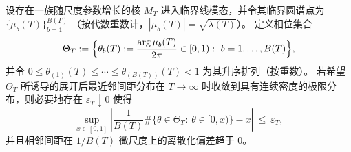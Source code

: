 \begin{conjecture}\label{conj:operator-phase-comb-uniformization-necessary}
设存在一族随尺度参数增长的核 \(M_T\) 进入临界线模态，并令其临界圆谱点为
\(
\{\mu_b(T)\}_{b=1}^{B(T)}
\)
（按代数重数计，\(|\mu_b(T)|=\sqrt{\lambda(T)}\)）。
定义相位集合
\[
\Theta_T:=\Bigl\{\theta_b(T):=\frac{\arg\mu_b(T)}{2\pi}\in[0,1):\ b=1,\dots,B(T)\Bigr\},
\]
并令 \(0\le \theta_{(1)}(T)\le\cdots\le \theta_{(B(T))}(T)<1\) 为其升序排列（按重数）。
若希望 \(\Theta_T\) 所诱导的展开后最近邻间距分布在 \(T\to\infty\) 时收敛到具有连续密度的极限分布，则必要地存在 \(\varepsilon_T\downarrow 0\) 使得
\[
\sup_{x\in[0,1]}\left|
\frac{1}{B(T)}\#\{\theta\in\Theta_T:\ \theta\in[0,x)\}-x
\right|\ \le\ \varepsilon_T,
\]
并且相邻间距在 \(1/B(T)\) 微尺度上的离散化偏差趋于 \(0\)。
\end{conjecture}

\endinput
